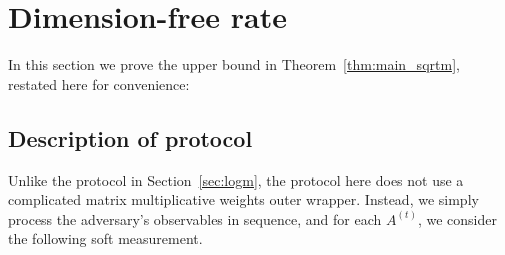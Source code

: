 \documentclass[10pt]{article}
\begin{document}

\section{Dimension-free rate}

In this section we prove the upper bound in Theorem~\ref{thm:main_sqrtm}, restated here for convenience:

\sqrtm*

\subsection{Description of protocol}

Unlike the protocol in Section~\ref{sec:logm}, the protocol here does not use a complicated matrix multiplicative weights outer wrapper. Instead, we simply process the adversary's observables in sequence, and for each $A^{(t)}$, we consider the following soft measurement.
\end{document}
